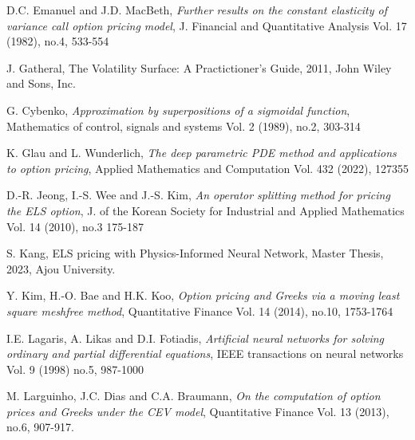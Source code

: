 \documentclass[11pt,reqno]{article}
\numberwithin{equation}{section}
\begin{document}
{\begin{thebibliography}{99}
D.C. Emanuel and J.D. MacBeth,
{\it Further results on the constant elasticity of variance call option pricing model},
J. Financial and Quantitative Analysis Vol. {17} (1982), no.4, 533-554

 J. Gatheral, The Volatility Surface: A Practictioner's Guide,
2011, John Wiley and Sons, Inc.

G. Cybenko, %
{\it Approximation by superpositions of a sigmoidal function},
Mathematics of control, signals and systems Vol. {2} (1989), no.2,
303-314

K. Glau and L. Wunderlich, 
{\it The deep parametric PDE method and applications to option pricing},
Applied Mathematics and Computation Vol. {432} (2022), 
127355

D.-R. Jeong, I.-S. Wee and J.-S. Kim, 
{\it An operator splitting method for pricing the ELS option},
J. of the Korean Society for Industrial and Applied Mathematics Vol. {14} (2010), no.3 175-187

S. Kang, ELS pricing with Physics-Informed Neural Network,
  Master Thesis, 2023, Ajou University.


Y. Kim, H.-O. Bae and H.K. Koo,
{\it Option pricing and Greeks via a moving least square meshfree method},
Quantitative Finance Vol. {14} (2014), no.10, 1753-1764


I.E. Lagaris, A. Likas and D.I. Fotiadis,
{\it Artificial neural networks for solving ordinary and partial differential equations},
IEEE transactions on neural networks Vol. {9} (1998) no.5,
987-1000
 
M. Larguinho, J.C. Dias and C.A. Braumann,
{\it On the computation of option prices and Greeks under the CEV model},
Quantitative Finance Vol. {13} (2013), no.6, 907-917.


\end{thebibliography}}
\end{document}
